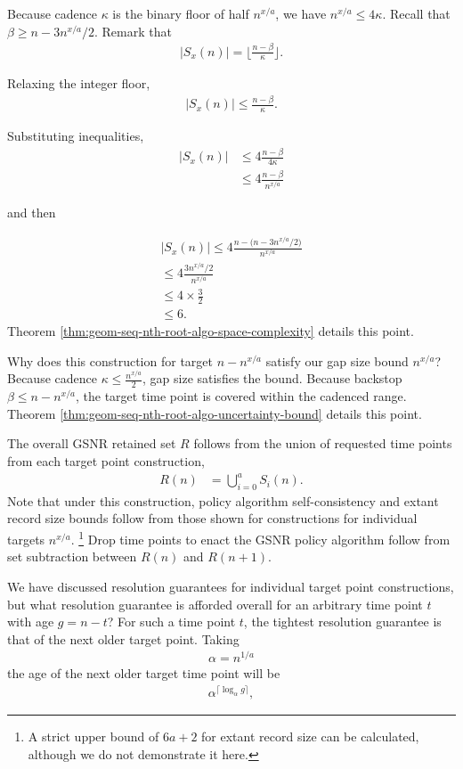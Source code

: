 Because cadence $\kappa$ is the binary floor of half $n^{x/a}$, we have $n^{x/a} \leq 4\kappa$.
Recall that $\beta \geq n - 3 n^{x/a} / 2$.
Remark that
\begin{align*}
|S_x(n)|
= \lfloor \frac{n - \beta}{\kappa} \rfloor.
\end{align*}

Relaxing the integer floor,
\begin{align*}
|S_x(n)|
\leq \frac{n - \beta}{\kappa}.
\end{align*}

Substituting inequalities,
\begin{align*}
|S_x(n)|
&\leq 4\frac{n - \beta}{4\kappa}\\
&\leq 4\frac{n - \beta}{n^{x/a}}
\end{align*}

and then

\begin{align*}
|S_x(n)|
\leq 4\frac{n - \Big(n - 3 n^{x/a} / 2\Big)}{n^{x/a}} \\
\leq 4\frac{3 n^{x/a} / 2}{n^{x/a}} \\
\leq 4 \times \frac{3}{2} \\
\leq 6.
\end{align*}
Theorem \ref{thm:geom-seq-nth-root-algo-space-complexity} details this point.

Why does this construction for target $n - n^{x/a}$ satisfy our gap size bound $n^{x/a}$?
Because cadence $\kappa \leq \frac{n^{x/a}}{2}$, gap size satisfies the bound.
Because backstop $\beta \leq n - n ^{x/a}$, the target time point is covered within the cadenced range.
Theorem \ref{thm:geom-seq-nth-root-algo-uncertainty-bound} details this point.

The overall GSNR retained set $R$ follows from the union of requested time points from each target point construction,
\begin{align*}
  R(n)
  &=
  \bigcup_{i=0}^{a} S_i(n).
\end{align*}
Note that under this construction, policy algorithm self-consistency and extant record size bounds follow from those shown for constructions for individual targets $n^{x/a}$.
\footnote{
A strict upper bound of $6a + 2$ for extant record size can be calculated, although we do not demonstrate it here.
}
Drop time points to enact the GSNR policy algorithm follow from set subtraction between $R(n)$ and $R(n+1)$.

We have discussed resolution guarantees for individual target point constructions, but what resolution guarantee is afforded overall for an arbitrary time point $t$ with age $g = n - t$?
For such a time point $t$, the tightest resolution guarantee is that of the next older target point.
Taking
\begin{align*}
\alpha = n^{1/a}
\end{align*}
the age of the next older target time point will be
\begin{align*}
\alpha^{ \lceil \log_{\alpha} g \rceil },
\end{align*}

